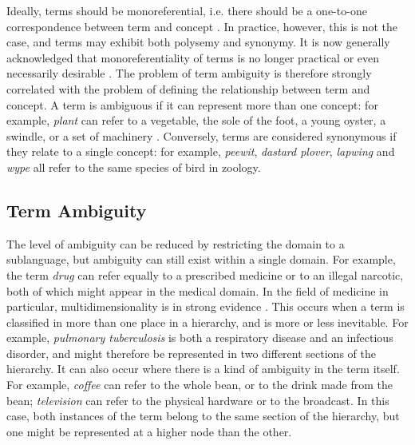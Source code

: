 Ideally, terms should be monoreferential, i.e. there should be a
one-to-one correspondence between term and concept
\cite{ISO87}. In practice, however, this is not the case, and
terms may exhibit both polysemy and synonymy. It is now generally
acknowledged that monoreferentiality of terms is no longer practical
or even necessarily desirable \cite{Sager90,Bowman97}. The problem of term
ambiguity is therefore strongly correlated with the problem of
defining the relationship between term and concept. A term is
ambiguous if it can represent more than one concept: for example,
{\it plant} can refer to a vegetable, the sole of the foot, a young
oyster, a swindle, or a set of machinery \cite{Webster99}. Conversely,
terms are considered synonymous if they relate to a single concept: for
example, {\it peewit}, {\it dastard plover}, {\it lapwing} and {\it wype}
all refer to the same species of bird in zoology. 

\subsection{Term Ambiguity}
The level of ambiguity can be reduced by restricting the domain to a
sublanguage, but ambiguity can still exist within a single domain. For
example, the term {\it drug} can refer equally to a prescribed
medicine or to an illegal narcotic, both of which might appear in the
medical domain. In the field of medicine in particular,
multidimensionality is in strong evidence \cite{DeVries94}. This occurs when a term is
classified in more than one place in a hierarchy, and is more or less
inevitable. For example, {\it pulmonary tuberculosis} is both a
respiratory disease and an infectious disorder, and might therefore be
represented in two different sections of the hierarchy. It can also occur
where there is a kind of ambiguity in the term itself. For example,
{\it coffee} can refer to the whole bean, or to the drink made from
the bean; {\it television} can refer to the physical hardware or to
the broadcast. In this case, both instances of the term belong to the
same section of the hierarchy, but one might be represented at a
higher node than the other.

